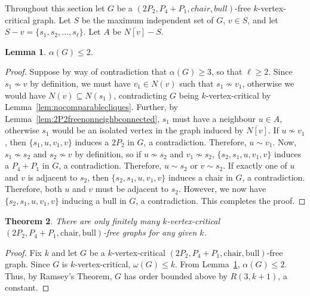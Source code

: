 \documentclass[11pt]{article}
\newtheorem{theorem}{Theorem}[section]
\newtheorem{lemma}[theorem]{Lemma}
\theoremstyle{definition}
\newcommand{\noneighbs}{\overline{N[v]}}
\begin{document}
Throughout this section let $G$ be a $(2P_2, P_4 + P_1, chair, bull)$-free $k$-vertex-critical graph. Let $S$ be the maximum independent set of $G$, $v \in S$, and let $S-v=\{s_1,s_2,\dots,s_{\ell}\}$. Let $A$ be $\noneighbs - S$. 

\begin{lemma}\label{lem:indnumatmost2bullchair}
$\alpha(G)\le 2$.
\end{lemma}
\begin{proof}
Suppose by way of contradiction that $\alpha(G)\ge 3$, so that $\ell\ge 2$. Since $s_1\nsim v$ by definition, we must have $v_1\in N(v)$ such that $s_1\nsim v_1$, otherwise we would have $N(v)\subseteq N(s_1)$, contradicting $G$ being $k$-vertex-critical by Lemma~\ref{lem:nocomparablecliques}. Further, by Lemma~\ref{lem:2P2freenonneighbconnected}, $s_1$ must have a neighbour $u\in A$, otherwise $s_1$ would be an isolated vertex in the graph induced by $\noneighbs$. If $u\nsim v_1$, then $\{s_1,u,v_1,v\}$ induces a $2P_2$ in $G$, a contradiction. Therefore, $u\sim v_1$. Now, $s_1\nsim s_2$ and $s_2\nsim v$ by definition, so if $u\nsim s_2$ and $v_1\nsim s_2$, $\{s_2,s_1,u,v_1,v\}$ induces a $P_4+P_1$ in $G$, a contradiction. Therefore, $u\sim s_2$ or $v\sim s_2$. If exactly one of $u$ and $v$ is adjacent to $s_2$, then $\{s_2,s_1,u,v_1,v\}$ induces a chair in $G$, a contradiction. Therefore, both $u$ and $v$ must be adjacent to $s_2$. However, we now have $\{s_2,s_1,u,v_1,v\}$ inducing a bull in $G$, a contradiction. This completes the proof.
\end{proof}

\begin{theorem}
There are only finitely many $k$-vertex-critical $(2P_2, P_4 + P_1,\text{chair}, \text{bull})$-free graphs for any given $k$.
\end{theorem}
\begin{proof}
Fix $k$ and let $G$ be a $k$-vertex-critical $(2P_2, P_4 + P_1,\text{chair}, \text{bull})$-free graph. Since $G$ is $k$-vertex-critical, $\omega(G)\le k$. From Lemma~\ref{lem:indnumatmost2bullchair}, $\alpha(G)\le 2$. Thus, by Ramsey's Theorem, $G$ has order bounded above by $R(3,k+1)$, a constant.
\end{proof}
\end{document}
